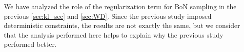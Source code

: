 We have analyzed the role of the regularization term for BoN sampling in the previous \cref{sec:kl_sec} and \cref{sec:WD}. Since the previous study \citep{jinnai2024regularized}  imposed deterministic constraints, the results are not exactly the same, but we consider that the analysis performed here helps to explain why the previous study performed better.

